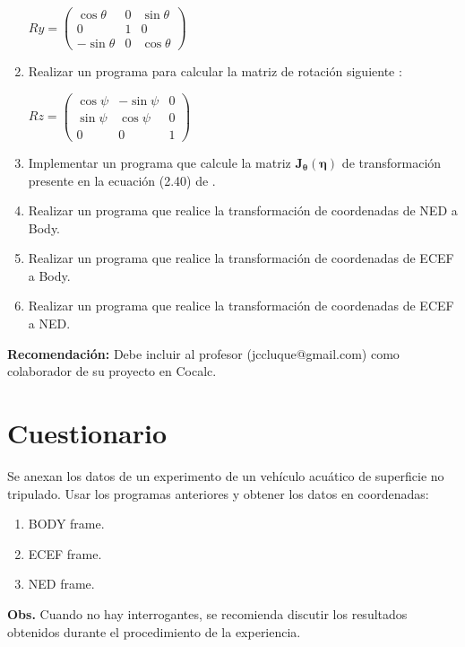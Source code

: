 \documentclass[12pt,oneside,spanish]{article}
\begin{document}
\begin{enumerate}
$R{y} = \begin{pmatrix} \cos\theta & 0 & \sin\theta \\ 0 & 1 & 0 \\ -\sin\theta & 0 & \cos\theta \end{pmatrix}$



\item Realizar un programa para calcular la matriz de rotación siguiente \cite{fossen:2011}:

$R{z} = \begin{pmatrix} \cos\psi & -\sin\psi & 0 \\ \sin\psi & \cos\psi & 0 \\ 0 & 0 & 1 \end{pmatrix}$



\item Implementar un programa que calcule la matriz $\mathbf{J_\theta (\eta)}$ de transformación presente en la ecuación (2.40) de \cite{fossen:2011}. 



\item Realizar un programa que realice la transformación de coordenadas de NED a Body.
\item Realizar un programa que realice la transformación de coordenadas de ECEF a Body.
\item Realizar un programa que realice la transformación de coordenadas de ECEF a NED.
\end{enumerate}

\textbf{Recomendación:} Debe incluir al profesor (jccluque@gmail.com) como colaborador de su proyecto en Cocalc.
\section{Cuestionario}
Se anexan los datos de un experimento de un vehículo acuático de superficie no tripulado. Usar los programas anteriores y obtener los datos en coordenadas:
\begin{enumerate}
    \item BODY frame.
    \item ECEF frame.
    \item NED frame.
\end{enumerate}
\textbf{Obs.} Cuando no hay interrogantes, se recomienda discutir los resultados obtenidos durante el procedimiento de la experiencia.
\end{document}

